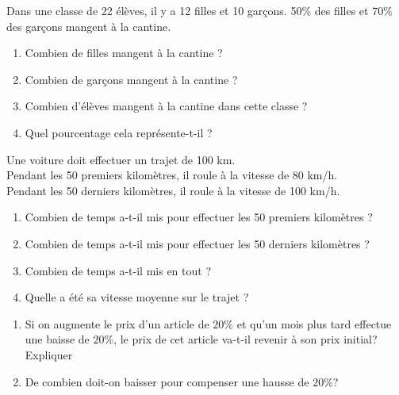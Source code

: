 \documentclass[10pt]{article}
\begin{document}
{\begin{Exo}
Dans une classe de 22 élèves, il y a 12 filles et 10 garçons.
50\% des filles et 70\% des garçons mangent à la cantine.
\begin{enumerate}
\item Combien de filles mangent à la cantine ?
\item Combien de garçons mangent à la cantine ?
\item Combien d'élèves mangent à la cantine dans cette classe ?
\item Quel pourcentage cela représente-t-il ?
\end{enumerate}
\end{Exo}

\begin{Exo}
Une voiture doit effectuer un trajet de 100 km.\\
Pendant les 50 premiers kilomètres, il roule à la vitesse de 80 km/h.\\
Pendant les 50 derniers kilomètres, il roule à la vitesse de 100 km/h.
\begin{enumerate}
\item Combien de temps a-t-il mis pour effectuer les 50 premiers kilomètres ?
\item Combien de temps a-t-il mis pour effectuer les 50 derniers kilomètres ?
\item Combien de temps a-t-il mis en tout ?
\item Quelle a été sa vitesse moyenne sur le trajet ?
\end{enumerate}
\end{Exo}


\begin{Exo}
\begin{enumerate}
\item Si on augmente le prix d'un article de $20\%$ et qu'un mois plus tard effectue une baisse de $20\%$, le prix de cet article va-t-il revenir à son prix initial? Expliquer
\item De combien doit-on baisser pour compenser une hausse de $20\%$?
\end{enumerate}
\end{Exo}
  
}
\end{document}
